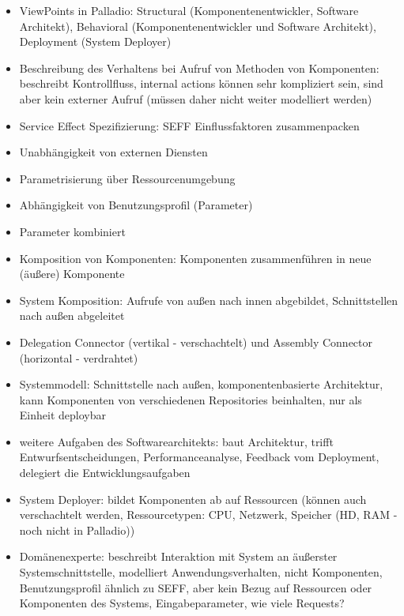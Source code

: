 \documentclass[paper=a4, fontsize=11pt]{scrartcl} %
\numberwithin{equation}{section} %
\numberwithin{figure}{section} %
\numberwithin{table}{section} %
\begin{document}
\begin{itemize}
\begin{itemize}
\begin{itemize}
\begin{itemize}
      \end{itemize}
      \item ViewPoints in Palladio: Structural (Komponentenentwickler, Software Architekt), Behavioral (Komponentenentwickler und Software Architekt), Deployment (System Deployer)
      \item Beschreibung des Verhaltens bei Aufruf von Methoden von Komponenten: beschreibt Kontrollfluss, internal actions können sehr kompliziert sein, sind aber kein externer Aufruf (müssen daher nicht weiter modelliert werden)
      \item Service Effect Spezifizierung: SEFF Einflussfaktoren zusammenpacken
      \item Unabhängigkeit von externen Diensten
      \item Parametrisierung über Ressourcenumgebung
      \item Abhängigkeit von Benutzungsprofil (Parameter)
      \item Parameter kombiniert
      \item Komposition von Komponenten: Komponenten zusammenführen in neue (äußere) Komponente
      \item System Komposition: Aufrufe von außen nach innen abgebildet, Schnittstellen nach außen abgeleitet
      \item Delegation Connector (vertikal - verschachtelt) und Assembly Connector (horizontal - verdrahtet)
      \item Systemmodell: Schnittstelle nach außen, komponentenbasierte Architektur, kann Komponenten von verschiedenen Repositories beinhalten, nur als Einheit deploybar
      \item weitere Aufgaben des Softwarearchitekts: baut Architektur, trifft Entwurfsentscheidungen, Performanceanalyse, Feedback vom Deployment, delegiert die Entwicklungsaufgaben
      \item System Deployer: bildet Komponenten ab auf Ressourcen (können auch verschachtelt werden, Ressourcetypen: CPU, Netzwerk, Speicher (HD, RAM - noch nicht in Palladio))
      \item Domänenexperte: beschreibt Interaktion mit System an äußerster Systemschnittstelle, modelliert Anwendungsverhalten, nicht Komponenten, Benutzungsprofil ähnlich zu SEFF, aber kein Bezug auf Ressourcen oder Komponenten des Systems, Eingabeparameter, wie viele Requests?\\

\end{itemize}
\end{itemize}
\end{itemize}
\end{document}
